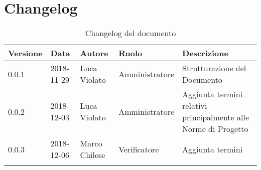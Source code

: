 \section{Changelog}

\begin{center}
\begin{longtable}[c]{|m{}|m{}|m{}|m{}|p{}|}
\hline
\textbf{Versione} & \textbf{Data} & \textbf{Autore} & \textbf{Ruolo} & \textbf{Descrizione} \\
\hline \hline
\endfirsthead
0.0.1 & 2018-11-29 & Luca Violato & Amministratore & Strutturazione del Documento \\
\hline
0.0.2 & 2018-12-03 & Luca Violato & Amministratore & Aggiunta termini relativi principalmente alle Norme di Progetto \\
\hline
0.0.3 & 2018-12-06 & Marco Chilese & Verificatore & Aggiunta termini\\
\caption{Changelog del documento}
\end{longtable}
\end{center}